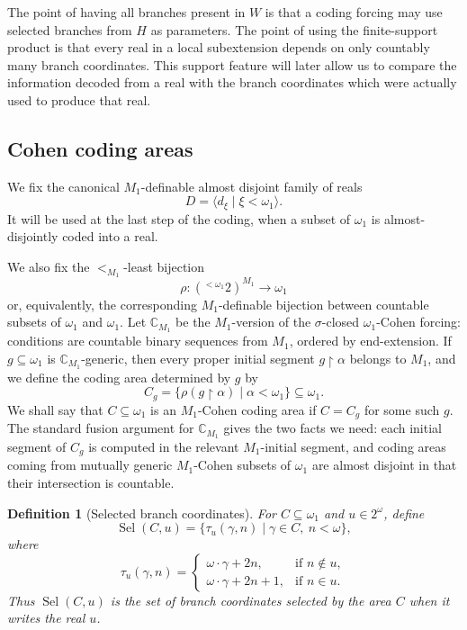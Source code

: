 \documentclass[a4paper,11pt]{article}
\newtheorem{definition}[theorem]{Definition}
\begin{document}
The point of having all branches present in $W$ is that a coding forcing may use selected branches from $H$ as parameters.  The point of using the finite-support product is that every real in a local subextension depends on only countably many branch coordinates.  This support feature will later allow us to compare the information decoded from a real with the branch coordinates which were actually used to produce that real.

\subsection{Cohen coding areas}

We fix the canonical $M_1$-definable almost disjoint family of reals
\[
   D=\langle d_\xi\mid \xi<\omega_1\rangle.
\]
It will be used at the last step of the coding, when a subset of $\omega_1$ is almost-disjointly coded into a real.

We also fix the $<_{M_1}$-least bijection
\[
   \rho: ({}^{<\omega_1}2)^{M_1}\longrightarrow \omega_1
\]
or, equivalently, the corresponding $M_1$-definable bijection between countable subsets of $\omega_1$ and $\omega_1$.  Let $\mathbb C_{M_1}$ be the $M_1$-version of the $\sigma$-closed $\omega_1$-Cohen forcing: conditions are countable binary sequences from $M_1$, ordered by end-extension.  If $g\subseteq\omega_1$ is $\mathbb C_{M_1}$-generic, then every proper initial segment $g\upharpoonright\alpha$ belongs to $M_1$, and we define the coding area determined by $g$ by
\[
   C_g=\{\rho(g\upharpoonright\alpha)\mid \alpha<\omega_1\}\subseteq\omega_1.
\]
We shall say that $C\subseteq\omega_1$ is an $M_1$-Cohen coding area if $C=C_g$ for some such $g$.  The standard fusion argument for $\mathbb C_{M_1}$ gives the two facts we need: each initial segment of $C_g$ is computed in the relevant $M_1$-initial segment, and coding areas coming from mutually generic $M_1$-Cohen subsets of $\omega_1$ are almost disjoint in that their intersection is countable.

\begin{definition}[Selected branch coordinates]\label{def:selected-branch-coordinates}
For \(C\subseteq\omega_1\) and \(u\in2^\omega\), define
\[
   \operatorname{Sel}(C,u)=
   \{\tau_u(\gamma,n)\mid \gamma\in C,\ n<\omega\},
\]
where
\[
   \tau_u(\gamma,n)=
   \begin{cases}
      \omega\cdot\gamma+2n, &\text{if } n\notin u,\\
      \omega\cdot\gamma+2n+1, &\text{if } n\in u.
   \end{cases}
\]
Thus \(\operatorname{Sel}(C,u)\) is the set of branch coordinates selected by
the area \(C\) when it writes the real \(u\).
\end{definition}
\end{document}

